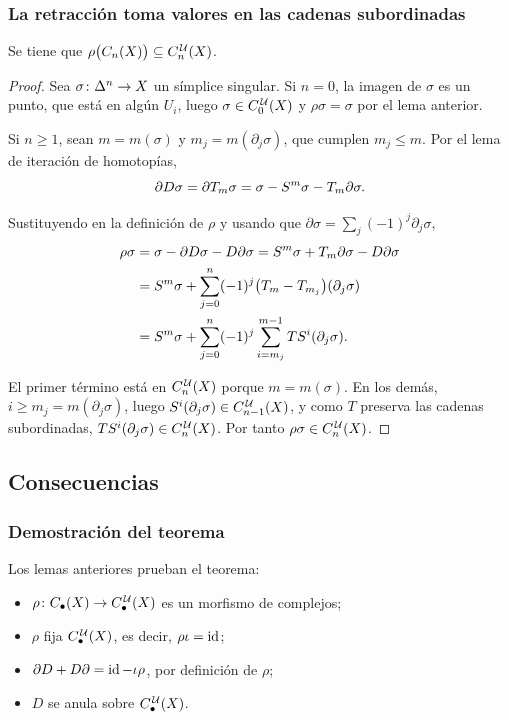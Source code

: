 \begin{frame}[allowframebreaks]
  \frametitle{La retracción toma valores en las cadenas subordinadas}

  \begin{lemma}
    Se tiene que $\rho\bigl(C_n(X)\bigr)\subseteq C^{\mkern2mu\mathcal{U}}_n(X)$.
  \end{lemma}

  \begin{proof}
    Sea $\sigma\colon\Delta^{n}\to X$ un símplice singular. Si $n=0$, la
    imagen de $\sigma$ es un punto, que está en algún $U_i$, luego
    $\sigma\in C^{\mkern2mu\mathcal{U}}_0(X)$ y $\rho\sigma=\sigma$ por el lema anterior.

    \medskip

    Si $n\geq1$, sean $m=m(\sigma)$ y $m_j=m(\partial_j\sigma)$, que cumplen
    $m_j\leq m$. Por el lema de iteración de homotopías,
    \[
      \partial D\sigma=\partial T_m\sigma
      =\sigma-S^m\sigma-T_m\partial\sigma.
    \]

    \framebreak

    Sustituyendo en la definición de $\rho$ y usando que
    $\partial\sigma=\sum_j(-1)^j\partial_j\sigma$,
    \begin{align*}
      \rho\sigma
      &=\sigma-\partial D\sigma-D\partial\sigma
       =S^m\sigma+T_m\partial\sigma-D\partial\sigma\\
      &=S^m\sigma+\sum_{j=0}^n(-1)^j\bigl(T_m-T_{m_j}\bigr)(\partial_j\sigma)\\
      &=S^m\sigma+\sum_{j=0}^n(-1)^j\sum_{i=m_j}^{m-1}TS^i(\partial_j\sigma).
    \end{align*}

    El primer término está en $C^{\mkern2mu\mathcal{U}}_n(X)$ porque $m=m(\sigma)$. En los
    demás, $i\geq m_j=m(\partial_j\sigma)$, luego
    $S^i(\partial_j\sigma)\in C^{\mkern2mu\mathcal{U}}_{n-1}(X)$, y como $T$ preserva las cadenas
    subordinadas, $TS^i(\partial_j\sigma)\in C^{\mkern2mu\mathcal{U}}_n(X)$. Por tanto
    $\rho\sigma\in C^{\mkern2mu\mathcal{U}}_n(X)$.
  \end{proof}
\end{frame}

\subsection{Consecuencias}

\begin{frame}
  \frametitle{Demostración del teorema}

  Los lemas anteriores prueban el teorema:
  \begin{itemize}
    \item $\rho\colon C_\bullet(X)\to C^{\mkern2mu\mathcal{U}}_\bullet(X)$ es un morfismo de complejos;
    \item $\rho$ fija $C^{\mkern2mu\mathcal{U}}_\bullet(X)$, es decir, $\rho\iota=\operatorname{id}$;
    \item $\partial D+D\partial=\operatorname{id}-\iota\rho$, por definición de $\rho$;
    \item $D$ se anula sobre $C^{\mkern2mu\mathcal{U}}_\bullet(X)$.
  \end{itemize}
\end{frame}

